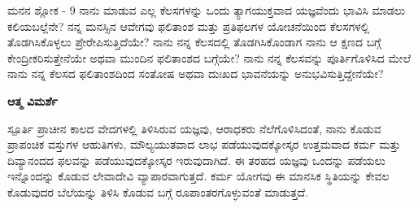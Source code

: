 
\newpage
\begin{mananam}{\mananamfont ಮನನ ಶ್ಲೋಕ - \textenglish{9}}
\footnotesize \mananamtext ನಾನು ಮಾಡುವ ಎಲ್ಲ ಕೆಲಸಗಳನ್ನು ಒಂದು ತ್ಯಾಗಯುಕ್ತವಾದ ಯಜ್ಞವೆಂದು ಭಾವಿಸಿ ಮಾಡಲು ಕಲಿಯಬಲ್ಲೆನೇ? ನನ್ನ ಮನಸ್ಸಿನ ಆವೇಗವು ಫಲಿತಾಂಶ ಮತ್ತು ಪ್ರತಿಫಲಗಳ ಯೋಚನೆಯಿಂದ ಕೆಲಸಗಳಲ್ಲಿ ತೊಡಗಿಸಿಕೊಳ್ಳಲು ಪ್ರೇರೇಪಿಸುತ್ತಿದೆಯೇ? ನಾನು ನನ್ನ ಕೆಲಸದಲ್ಲಿ ತೊಡಗಿಸಿಕೊಂಡಾಗ ನಾನು ಆ ಕ್ಷಣದ ಬಗ್ಗೆ ಕೇಂದ್ರೀಕರಿಸುತ್ತೇನೆಯೇ ಅಥವಾ ಮುಂದಿನ ಫಲಿತಾಂಶದ ಬಗ್ಗೆಯೇ? ನಾನು ನನ್ನ ಕೆಲಸವನ್ನು ಪೂರ್ತಿಗೊಳಿಸಿದ ಮೇಲೆ ನಾನು ನನ್ನ ಕೆಲಸದ ಫಲಿತಾಂಶದಿಂದ ಸಂತೋಷ ಅಥವಾ ದುಃಖದ ಭಾವನೆಯನ್ನು ಅನುಭವಿಸುತ್ತಿದ್ದೇನೆಯೇ?
\end{mananam}
\WritingHand\enspace\textbf{ಆತ್ಮ ವಿಮರ್ಶೆ}\\
\begin{inspiration}{\mananamfont ಸ್ಪೂರ್ತಿ}
\footnotesize \mananamtext ಪ್ರಾಚೀನ ಕಾಲದ ವೇದಗಳಲ್ಲಿ ತಿಳಿಸಿರುವ ಯಜ್ಞವು, ಆರಾಧಕರು ನೆಲೆಗೊಳಿಸಿದಂತೆ, ನಾನು ಕೊಡುವ ಪ್ರಾಪಂಚಿಕ ವಸ್ತುಗಳ ಆಹುತಿಗಳು, ಮೌಲ್ಯಯುತವಾದ ಲಾಭ ಪಡೆಯುವುದಕ್ಕೋಸ್ಕರ ಉತ್ತಮವಾದ ಕರ್ಮ ಮತ್ತು ದಿವ್ಯಾನಂದದ ಫಲವನ್ನು ಪಡೆಯುವುದಕ್ಕೋಸ್ಕರ ಇರುವುದಾಗಿದೆ. ಈ ತರಹದ ಯಜ್ಞವು ಒಂದನ್ನು ಪಡೆಯಲು ಇನ್ನೊಂದನ್ನು ಕೊಡುವ ಲೇವಾದೇವಿ ವ್ಯಾಪಾರವಾಗುತ್ತದೆ. ಕರ್ಮ ಯೋಗವು ಈ ಮಾನಸಿಕ ಸ್ಥಿತಿಯನ್ನು ಕೇವಲ ಕೊಡುವುದರ ಬೆಲೆಯನ್ನು ತಿಳಿಸಿ ಕೊಡುವ ಬಗ್ಗೆ ರೂಪಾಂತರಗೊಳ್ಳುವಂತೆ ಮಾಡುತ್ತದೆ.
\end{inspiration}
\newpage


